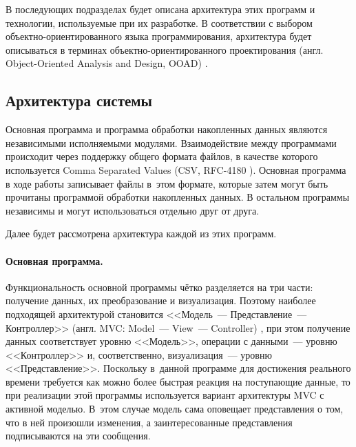 \documentclass[a4paper, 14pt]{extarticle}
\newcommand{\eng}[1]{{\English #1}}
\begin{document}
  В последующих подразделах будет описана архитектура этих программ и технологии, используемые при их
  разработке. В соответствии с выбором объектно-ориентированного языка программирования, архитектура будет описываться в
  терминах объектно-ориентированного проектирования (англ. \eng{Object-Oriented Analysis and Design,
  OOAD}) \cite{booch-ooad}.

  \subsection{Архитектура системы}

  Основная программа и программа обработки накопленных данных являются независимыми исполняемыми
  модулями. Взаимодействие между программами происходит через поддержку общего формата файлов, в
  качестве которого используется \eng{Comma Separated Values} (CSV, RFC-4180 \cite{rfc4180}).
  Основная программа в ходе работы записывает файлы в~этом формате, которые затем могут быть прочитаны
  программой обработки накопленных данных. В остальном программы независимы и могут использоваться
  отдельно друг от друга.

  Далее будет рассмотрена архитектура каждой из этих программ.

  \paragraph{Основная программа.}
  Функциональность основной программы чётко разделяется на три части: получение данных, их
  преобразование и визуализация. Поэтому наиболее подходящей архитектурой становится
  <<Модель~--- Представление~--- Контроллер>> (англ. \eng{MVC: Model~--- View~--- Controller})
  \cite{gamma-patterns}, при этом получение данных соответствует уровню <<Модель>>, операции с
  данными~--- уровню <<Контроллер>> и, соответственно, визуализация~--- уровню <<Представление>>.
  Поскольку в~данной программе для
  достижения реального времени требуется как можно более быстрая реакция на поступающие данные, то
  при реализации этой программы используется вариант архитектуры MVC с активной моделью.
  В~этом случае модель сама оповещает представления о том, что в ней произошли изменения, а
  заинтересованные представления подписываются на эти сообщения.
\end{document}
